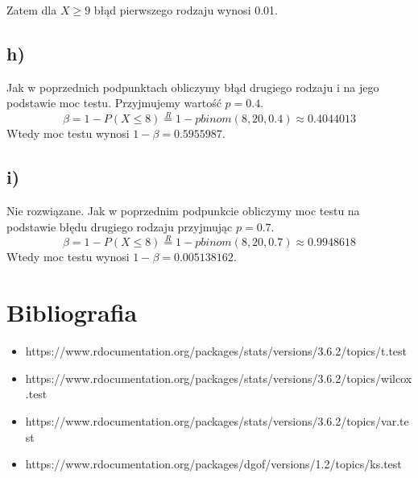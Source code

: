 \documentclass{article}
\begin{document}
Zatem dla $X \geq 9$ błąd pierwszego rodzaju wynosi 0.01.

\subsection{h)}
Jak w poprzednich podpunktach obliczymy błąd drugiego rodzaju i na jego podstawie moc testu. Przyjmujemy wartość $p = 0.4$.
\[ \beta = 1 - P(X \leq 8) \overset{R}{=} 1 - pbinom(8, 20, 0.4) \approx 0.4044013 \]
Wtedy moc testu wynosi $1 - \beta = 0.5955987$.

\subsection{i)}
Nie rozwiązane.
Jak w poprzednim podpunkcie obliczymy moc testu na podstawie błędu drugiego rodzaju przyjmując $p = 0.7$.
\[ \beta = 1 - P(X \leq 8) \overset{R}{=} 1 - pbinom(8, 20, 0.7) \approx 0.9948618 \]
Wtedy moc testu wynosi $1 - \beta = 0.005138162$.



\section{Bibliografia}
\begin{itemize}
\item https://www.rdocumentation.org/packages/stats/versions/3.6.2/topics/t.test
\item https://www.rdocumentation.org/packages/stats/versions/3.6.2/topics/wilcox.test
\item https://www.rdocumentation.org/packages/stats/versions/3.6.2/topics/var.test
\item https://www.rdocumentation.org/packages/dgof/versions/1.2/topics/ks.test
\end{itemize}
\end{document}
